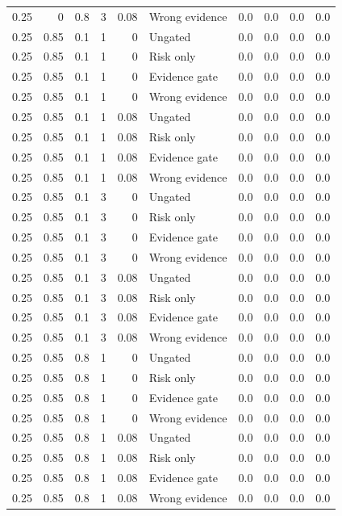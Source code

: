 \begin{longtable}{rrrrrlrrrr}
0.25 & 0 & 0.8 & 3 & 0.08 & Wrong evidence & 0.0 & 0.0 & 0.0 & 0.0\\
0.25 & 0.85 & 0.1 & 1 & 0 & Ungated & 0.0 & 0.0 & 0.0 & 0.0\\
0.25 & 0.85 & 0.1 & 1 & 0 & Risk only & 0.0 & 0.0 & 0.0 & 0.0\\
0.25 & 0.85 & 0.1 & 1 & 0 & Evidence gate & 0.0 & 0.0 & 0.0 & 0.0\\
0.25 & 0.85 & 0.1 & 1 & 0 & Wrong evidence & 0.0 & 0.0 & 0.0 & 0.0\\
0.25 & 0.85 & 0.1 & 1 & 0.08 & Ungated & 0.0 & 0.0 & 0.0 & 0.0\\
0.25 & 0.85 & 0.1 & 1 & 0.08 & Risk only & 0.0 & 0.0 & 0.0 & 0.0\\
0.25 & 0.85 & 0.1 & 1 & 0.08 & Evidence gate & 0.0 & 0.0 & 0.0 & 0.0\\
0.25 & 0.85 & 0.1 & 1 & 0.08 & Wrong evidence & 0.0 & 0.0 & 0.0 & 0.0\\
0.25 & 0.85 & 0.1 & 3 & 0 & Ungated & 0.0 & 0.0 & 0.0 & 0.0\\
0.25 & 0.85 & 0.1 & 3 & 0 & Risk only & 0.0 & 0.0 & 0.0 & 0.0\\
0.25 & 0.85 & 0.1 & 3 & 0 & Evidence gate & 0.0 & 0.0 & 0.0 & 0.0\\
0.25 & 0.85 & 0.1 & 3 & 0 & Wrong evidence & 0.0 & 0.0 & 0.0 & 0.0\\
0.25 & 0.85 & 0.1 & 3 & 0.08 & Ungated & 0.0 & 0.0 & 0.0 & 0.0\\
0.25 & 0.85 & 0.1 & 3 & 0.08 & Risk only & 0.0 & 0.0 & 0.0 & 0.0\\
0.25 & 0.85 & 0.1 & 3 & 0.08 & Evidence gate & 0.0 & 0.0 & 0.0 & 0.0\\
0.25 & 0.85 & 0.1 & 3 & 0.08 & Wrong evidence & 0.0 & 0.0 & 0.0 & 0.0\\
0.25 & 0.85 & 0.8 & 1 & 0 & Ungated & 0.0 & 0.0 & 0.0 & 0.0\\
0.25 & 0.85 & 0.8 & 1 & 0 & Risk only & 0.0 & 0.0 & 0.0 & 0.0\\
0.25 & 0.85 & 0.8 & 1 & 0 & Evidence gate & 0.0 & 0.0 & 0.0 & 0.0\\
0.25 & 0.85 & 0.8 & 1 & 0 & Wrong evidence & 0.0 & 0.0 & 0.0 & 0.0\\
0.25 & 0.85 & 0.8 & 1 & 0.08 & Ungated & 0.0 & 0.0 & 0.0 & 0.0\\
0.25 & 0.85 & 0.8 & 1 & 0.08 & Risk only & 0.0 & 0.0 & 0.0 & 0.0\\
0.25 & 0.85 & 0.8 & 1 & 0.08 & Evidence gate & 0.0 & 0.0 & 0.0 & 0.0\\
0.25 & 0.85 & 0.8 & 1 & 0.08 & Wrong evidence & 0.0 & 0.0 & 0.0 & 0.0\\

\end{longtable}
